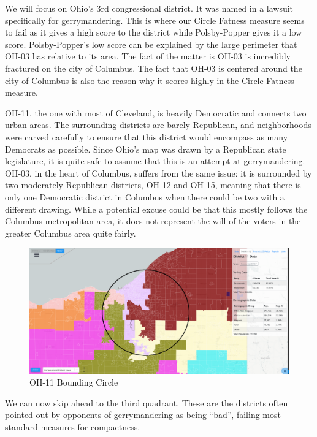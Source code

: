 \documentclass[letterpaper]{article}
\begin{document}
We will focus on Ohio's 3rd congressional district. It was named in a lawsuit specifically for gerrymandering. This is where our Circle Fatness measure seems to fail as it gives a high score to the district while Polsby-Popper gives it a low score. Polsby-Popper's low score can be explained by the large perimeter that OH-03 has relative to its area. The fact of the matter is OH-03 is incredibly fractured on the city of Columbus. The fact that OH-03 is centered around the city of Columbus is also the reason why it scores highly in the Circle Fatness measure.

OH-11, the one with most of Cleveland, is heavily Democratic and connects two urban areas. The surrounding districts are barely Republican, and neighborhoods were carved carefully to ensure that this district would encompass as many Democrats as possible. Since Ohio’s map was drawn by a Republican state legislature, it is quite safe to assume that this is an attempt at gerrymandering. OH-03, in the heart of Columbus, suffers from the same issue: it is surrounded by two moderately Republican districts, OH-12 and OH-15, meaning that there is only one Democratic district in Columbus when there could be two with a different drawing.  While a potential excuse could be that this mostly follows the Columbus metropolitan area, it does not represent the will of the voters in the greater Columbus area quite fairly. 

\begin{figure}[H]
	\includegraphics[width=\linewidth]{./figures/OH-11-BoundingCircle.png}
	\caption{OH-11 Bounding Circle}
	\label{fig:oh11boundingCircle}
\end{figure}



We can now skip ahead to the third quadrant. These are the districts often pointed out by opponents of gerrymandering as being “bad”, failing most standard measures for compactness.
\end{document}
